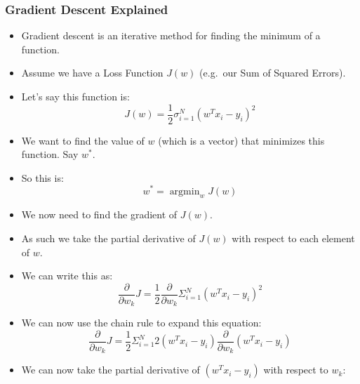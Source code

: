 \documentclass[12pt]{article}
\DeclareMathOperator*{\argmin}{argmin}
\begin{document}
\begin{itemize}
                    \subsubsection{Gradient Descent Explained}
                        \begin{itemize}
                            \item Gradient descent is an iterative method for finding the minimum of a function.
                            \item Assume we have a Loss Function $J(w)$ (e.g.\ our Sum of Squared Errors).
                            \item Let's say this function is:
                            \begin{equation}
                                J(w) = \frac{1}{2} \sigma_{i=1}^N {({w^T}x_i - y_i)}^2
                            \end{equation}
                            \item We want to find the value of $w$ (which is a vector) that minimizes this function. Say $w^*$.
                            \item So this is:
                            \begin{equation}
                                w^* = \argmin_w J(w)
                            \end{equation}
                            \item We now need to find the gradient of $J(w)$.
                            \item As such we take the partial derivative of $J(w)$ with respect to each element of $w$.
                            \item We can write this as:
                            \begin{equation}
                                \frac{\partial}{\partial w_k} J = \frac{1}{2} \frac{\partial}{\partial w_k} \Sigma_{i=1}^N {({w^T}x_i - y_i)}^2
                            \end{equation}
                            \item We can now use the chain rule to expand this equation:
                            \begin{equation}
                                \frac{\partial}{\partial w_k} J = \frac{1}{2} \Sigma_{i=1}^N 2({w^T}x_i - y_i) \frac{\partial}{\partial w_k} ({w^T}x_i - y_i)
                            \end{equation}
                            \item We can now take the partial derivative of $({w^T}x_i - y_i)$ with respect to $w_k$:

\end{itemize}
\end{itemize}
\end{document}
